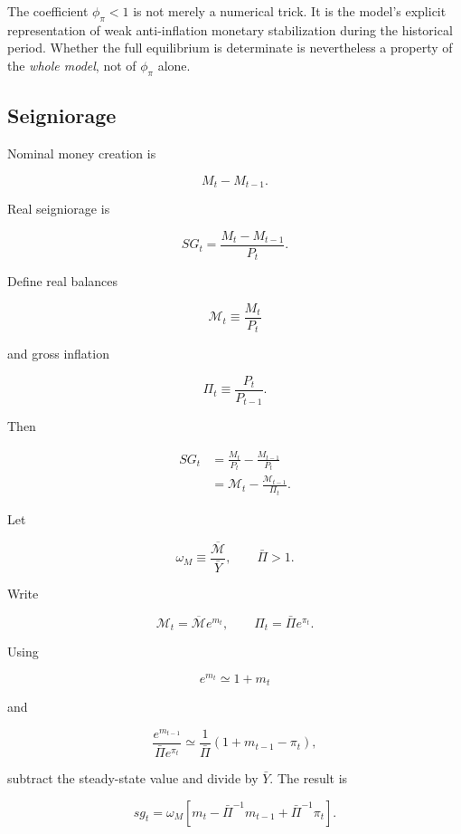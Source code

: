 The coefficient \(\phi_{\pi}<1\) is not merely a numerical trick. It is the
model's explicit representation of weak anti-inflation monetary stabilization
during the historical period. Whether the full equilibrium is determinate is
nevertheless a property of the \emph{whole model}, not of \(\phi_\pi\) alone.

\subsection{Seigniorage}
\label{app:seigniorage}

Nominal money creation is

\[
M_t-M_{t-1}.
\]

Real seigniorage is

\begin{equation}
SG_t
=
\frac{M_t-M_{t-1}}{P_t}.
\label{eq:sg_level_1}
\end{equation}

Define real balances

\[
\mathcal M_t\equiv\frac{M_t}{P_t}
\]

and gross inflation

\[
\Pi_t\equiv\frac{P_t}{P_{t-1}}.
\]

Then

\begin{align}
SG_t
&=
\frac{M_t}{P_t}
-
\frac{M_{t-1}}{P_t}
\\
&=
\mathcal M_t
-
\frac{\mathcal M_{t-1}}{\Pi_t}.
\label{eq:sg_exact}
\end{align}

Let

\[
\omega_M
\equiv
\frac{\overline{\mathcal M}}{\bar Y},
\qquad
\bar\Pi>1.
\]

Write

\[
\mathcal M_t=\overline{\mathcal M}e^{m_t},
\qquad
\Pi_t=\bar\Pi e^{\pi_t}.
\]

Using

\[
e^{m_t}\simeq1+m_t
\]

and

\[
\frac{e^{m_{t-1}}}{\bar\Pi e^{\pi_t}}
\simeq
\frac{1}{\bar\Pi}
\left(
1+m_{t-1}-\pi_t
\right),
\]

subtract the steady-state value and divide by \(\bar Y\). The result is

\begin{equation}
\boxed{
sg_t
=
\omega_M
\left[
m_t
-
\bar\Pi^{-1}m_{t-1}
+
\bar\Pi^{-1}\pi_t
\right].
}
\label{eq:sg_final}
\end{equation}

